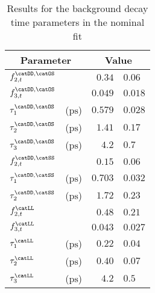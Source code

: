 \begin{table}
  \caption{Results for the background decay time parameters in the nominal fit}
  \label{tab:app:measurement_of_sin2beta:cpv_measurement:results:time:bkg}
  \centering
  \begin{tabular}{llr@{$\,\pm\,$}l}
      \toprule
      \multicolumn{2}{c}{Parameter}       & \multicolumn{2}{c}{Value}                  \\
      \midrule
      $f^{\catDD,\catOS}_{2,t}$   &                       & $0.34$    & $0.06$   \\
      $f^{\catDD,\catOS}_{3,t}$   &                       & $0.049$   & $0.018$  \\
      $\tau^{\catDD,\catOS}_{1}$  & ($\si{\pico\second}$) & $0.579$   & $0.028$  \\
      $\tau^{\catDD,\catOS}_{2}$  & ($\si{\pico\second}$) & $1.41$    & $0.17$   \\
      $\tau^{\catDD,\catOS}_{3}$  & ($\si{\pico\second}$) & $4.2$     & $0.7$    \\
      \midrule
      $f^{\catDD,\catSS}_{2,t}$   &                       & $0.15$    & $0.06$   \\
      $\tau^{\catDD,\catSS}_{1}$  & ($\si{\pico\second}$) & $0.703$   & $0.032$   \\
      $\tau^{\catDD,\catSS}_{2}$  & ($\si{\pico\second}$) & $1.72$    & $0.23$   \\
      \midrule
      $f^{\catLL}_{2,t}$          &                       & $0.48$    & $0.21$   \\
      $f^{\catLL}_{3,t}$          &                       & $0.043$   & $0.027$  \\
      $\tau^{\catLL}_{1}$         & ($\si{\pico\second}$) & $0.22$    & $0.04$  \\
      $\tau^{\catLL}_{2}$         & ($\si{\pico\second}$) & $0.40$    & $0.07$   \\
      $\tau^{\catLL}_{3}$         & ($\si{\pico\second}$) & $4.2$     & $0.5$    \\
      \bottomrule
    \end{tabular}
\end{table}

